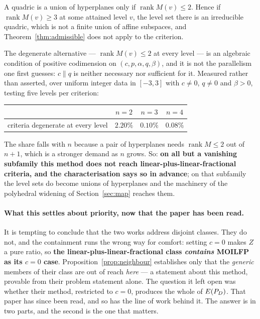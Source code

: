 \documentclass[11pt,a4paper]{article}
\begin{document}
\begin{proposition}
\label{prop:neighbour}
A quadric is a union of hyperplanes only if $\operatorname{rank} M(v)
\leqslant 2$.  Hence if $\operatorname{rank} M(v) \geqslant 3$ at some
attained level $v$, the level set there is an irreducible quadric, which is
not a finite union of affine subspaces, and
Theorem~\ref{thm:admissible} does not apply to the criterion.
\end{proposition}

\noindent
The degenerate alternative --- $\operatorname{rank} M(v) \leqslant 2$ at
every level --- is an algebraic condition of positive codimension on
$(c, p, \alpha, q, \beta)$, and it is not the parallelism one first guesses:
$c \parallel q$ is neither necessary nor sufficient for it.  Measured rather
than asserted, over uniform integer data in $[-3,3]$ with $c \neq 0$,
$q \neq 0$ and $\beta > 0$, testing five levels per criterion:

\begin{center}
\begin{tabular}{lccc}
\toprule
 & $n=2$ & $n=3$ & $n=4$ \\
\midrule
criteria degenerate at every level & $2.20\%$ & $0.10\%$ & $0.08\%$ \\
\bottomrule
\end{tabular}
\end{center}

\noindent
The share falls with $n$ because a pair of hyperplanes needs
$\operatorname{rank} M \leqslant 2$ out of $n+1$, which is a stronger demand
as $n$ grows.  So: \textbf{on all but a vanishing subfamily this method does
not reach linear-plus-linear-fractional criteria, and the characterisation
says so in advance}; on that subfamily the level sets do become unions of
hyperplanes and the machinery of the polyhedral widening of Section~\ref{sec:map} reaches
them.

\paragraph{What this settles about priority, now that the paper has been
read.}
It is tempting to conclude that the two works address disjoint classes.
They do not, and the containment runs the wrong way for comfort: setting
$c = 0$ makes $Z$ a pure ratio, so \textbf{the
linear-plus-linear-fractional class \emph{contains} MOILFP as its $c = 0$
case}.  Proposition~\ref{prop:neighbour} establishes only that the
\emph{generic} members of their class are out of reach \emph{here} --- a
statement about this method, provable from their problem statement alone.
The question it left open was whether their method, restricted to $c = 0$,
produces the whole of $E(P_{D})$.  That paper has since been read, and so has the
line of work behind it.  The answer is in two parts, and the second is the
one that matters.
\end{document}
